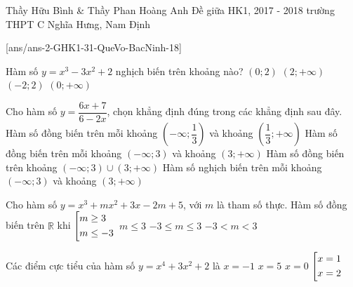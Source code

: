 
	\begin{name}
		{Thầy Hữu Bình \& Thầy Phan Hoàng Anh}
		{Đề giữa HK1, 2017 - 2018 trường THPT C Nghĩa Hưng, Nam Định}
	\end{name}
	\setcounter{ex}{0}
	[ans/ans-2-GHK1-31-QueVo-BacNinh-18]
	\begin{ex}%
		Hàm số $y=x^3-3x^2+2$ nghịch biến trên khoảng nào?
		\choice
		{\True $(0;2)$}
		{$(2;+\infty)$}
		{$(-2;2)$}
		{$(0;+\infty)$}
	\end{ex}
	\begin{ex}%
		Cho hàm số $y=\dfrac{6x+7}{6-2x}$, chọn khẳng định đúng trong các khẳng định sau đây.	
		\choice
		{Hàm số đồng biến trên mỗi khoảng $\left(-\infty;\dfrac{1}{3}\right)$ và khoảng $\left(\dfrac{1}{3};+\infty\right)$}
		{\True Hàm số đồng biến trên mỗi khoảng $(-\infty;3)$ và khoảng $(3;+\infty)$}
		{Hàm số đồng biến trên khoảng $(-\infty;3)\cup(3;+\infty)$}
		{Hàm số nghịch biến trên mỗi khoảng $(-\infty;3)$ và khoảng $(3;+\infty)$}
	\end{ex}
	\begin{ex}%
		Cho hàm số $y=x^3+mx^2+3x-2m+5$, với $m$ là tham số thực. Hàm số đồng biến trên $\mathbb{R}$ khi 
		\choice
		{$\left[\begin{aligned}&m\ge3\\&m\le-3\end{aligned}\right.$}
		{$m\le3$}
		{\True $-3\le m\le3$}
		{$-3<m<3$}
	\end{ex}
	\begin{ex}%
		Các điểm cực tiểu của hàm số $y=x^4+3x^2+2$ là
		\choice
		{$x=-1$}
		{$x=5$}
		{\True $x=0$}
		{$\left[\begin{aligned}&x=1\\&x=2\end{aligned}\right.$}
	\end{ex}
